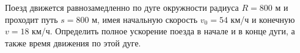 Поезд движется равнозамедленно по дуге окружности радиуса $R=800$ м и
проходит путь $s=800$ м, имея начальную скорость $v_0=54$ км/ч и
конечную $v=18$ км/ч. Определить полное ускорение поезда в начале и в
конце дуги, а также время движения по этой дуге.
